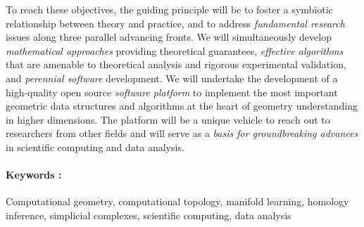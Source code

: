 To reach these objectives, the guiding principle will be to foster a
symbiotic relationship between theory and practice, and to address
{\em fundamental research} issues along three parallel advancing
fronts. We will simultaneously develop {\em mathematical approaches}
providing theoretical guarantees, {\em effective algorithms} that are
amenable to theoretical analysis and rigorous experimental validation,
and {\em perennial software} development.  We will undertake the
development of a high-quality open source {\em software platform} to
implement the most important geometric data structures and algorithms
at the heart of geometry understanding in higher dimensions. The
platform will be a unique vehicle to reach out to researchers from other
fields and will serve as a {\em basis for groundbreaking advances} in
scientific computing and data analysis.

\paragraph{Keywords :} Computational geometry, computational topology,
manifold learning, homology inference, simplicial complexes,
scientific computing, data analysis
